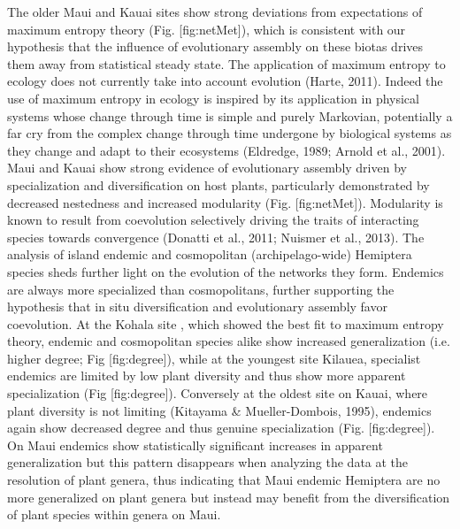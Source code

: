 \documentclass[12pt]{article}
\begin{document}
\begin{linenumbers}
The older Maui and Kauai sites show strong deviations from expectations of maximum entropy theory (Fig. [fig:netMet]), which is consistent with our hypothesis that the influence of evolutionary assembly on these biotas drives them away from statistical steady state. The application of maximum entropy to ecology does not currently take into account evolution (Harte, 2011). Indeed the use of maximum entropy in ecology is inspired by its application in physical systems whose change through time is simple and purely Markovian, potentially a far cry from the complex change through time undergone by biological systems as they change and adapt to their ecosystems (Eldredge, 1989; Arnold et al., 2001). Maui and Kauai show strong evidence of evolutionary assembly driven by specialization and diversification on host plants, particularly demonstrated by decreased nestedness and increased modularity (Fig. [fig:netMet]). Modularity is known to result from coevolution selectively driving the traits of interacting species towards convergence (Donatti et al., 2011; Nuismer et al., 2013).
The analysis of island endemic and cosmopolitan (archipelago-wide) Hemiptera species sheds further light on the evolution of the networks they form. Endemics are always more specialized than cosmopolitans, further supporting the hypothesis that in situ diversification and evolutionary assembly favor coevolution. At the Kohala site , which showed the best fit to maximum entropy theory, endemic and cosmopolitan species alike show increased generalization (i.e. higher degree; Fig [fig:degree]), while at the youngest site Kilauea, specialist endemics are limited by low plant diversity and thus show more apparent specialization (Fig [fig:degree]). Conversely at the oldest site on Kauai, where plant diversity is not limiting (Kitayama & Mueller-Dombois, 1995), endemics again show decreased degree and thus genuine specialization (Fig. [fig:degree]). On Maui endemics show statistically significant increases in apparent generalization but this pattern disappears when analyzing the data at the resolution of plant genera, thus indicating that Maui endemic Hemiptera are no more generalized on plant genera but instead may benefit from the diversification of plant species within genera on Maui.


\end{linenumbers}
\end{document}
